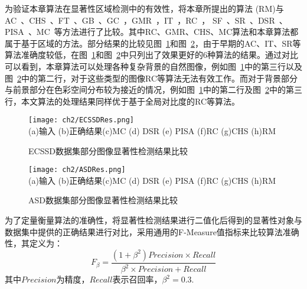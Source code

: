 为验证本章算法在显著性区域检测中的有效性，将本章所提出的算法 (RM)与AC~\cite{Achanta08}、CHS~\cite{Yan2014Hierarchical}、FT~\cite{saliencyFilter}、GB~\cite{Harel07graph-basedvisual}、GC~\cite{GC}，GMR~\cite{GMR}，IT~\cite{itti}，RC~\cite{ChengPAMI}， SF~\cite{saliencyFilter}、SR~\cite{SR}、DSR~\cite{DSR}、PISA~\cite{PISA}、MC~\cite{MC}等方法进行了比较。其中RC、GMR、CHS、MC算法和本章算法都属于基于区域的方法。部分结果的比较见图~\ref{fig:chap2:comp1}和图~\ref{fig:chap2:comp2}，由于早期的AC、IT、SR等算法准确度较低，在图~\ref{fig:chap2:comp1}和图~\ref{fig:chap2:comp2}中只列出了效果更好的6种算法的结果。通过对比可以看到，本章算法可以处理各种复杂背景的自然图像，例如图~\ref{fig:chap2:comp1}中的第三行以及图~\ref{fig:chap2:comp2}中的第二行，对于这些类型的图像RC等算法无法有效工作。而对于背景部分与前景部分在色彩空间分布较为接近的情况，例如图~\ref{fig:chap2:comp1}中的第二行及图~\ref{fig:chap2:comp2}中的第三行，本文算法的处理结果同样优于基于全局对比度的RC等算法。\par
\begin{figure}[h]
  \centering%
      {\texttt{[image: ch2/ECSSDRes.png]}}\\
(a)输入 (b)正确结果(c)MC \quad (d) DSR \quad (e) PISA \quad (f)RC \quad (g)CHS \quad (h)RM\\
  \caption{ECSSD数据集部分图像显著性检测结果比较}
  \label{fig:chap2:comp1}
\end{figure}
\begin{figure}[h]
  \centering%
      {\texttt{[image: ch2/ASDRes.png]}}\\
(a)输入 (b)正确结果(c)MC \quad (d) DSR \quad (e) PISA \quad (f)RC \quad (g)CHS \quad (h)RM\\
  \caption{ASD数据集部分图像显著性检测结果比较}
  \label{fig:chap2:comp2}
\end{figure}
为了定量衡量算法的准确性，将显著性检测结果进行二值化后得到的显著性对象与数据集中提供的正确结果进行对比，采用通用的F-Measure值指标来比较算法准确性，其定义为：
$$F_{\beta} = \frac{(1+\beta^2)Precision \times Recall}{\beta^2 \times Precision + Recall}$$
其中$Precision$为精度，$Recall$表示召回率，$\beta^2=0.3$. \par

